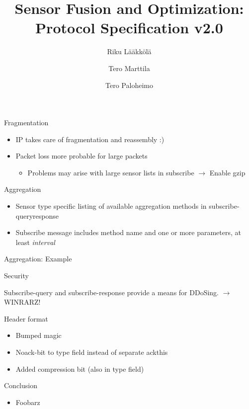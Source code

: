 \documentclass{beamer}
\title[SFO protocol]{Sensor Fusion and Optimization: Protocol Specification v2.0}
\author{Riku Lääkkölä \and Tero Marttila \and Tero Paloheimo}
\institute{Aalto ELEC}
\begin{document}
\begin{frame}
\titlepage
\end{frame}

\begin{frame}{Fragmentation}
\begin{itemize}
\item IP takes care of fragmentation and reassembly :)
\item Packet loss more probable for large packets
\begin{itemize}
\item Problems may arise with large sensor lists in subscribe $\rightarrow$ Enable gzip
\end{itemize}
\end{itemize}
\end{frame}

\begin{frame}{Aggregation}
\begin{itemize}
\item Sensor type specific listing of available aggregation methods in subscribe-queryresponse
\item Subscribe message includes method name and one or more parameters, at least \emph{interval}
\end{itemize}
\end{frame}

\begin{frame}{Aggregation: Example}
\end{frame}

\begin{frame}{Security}
\item Subscribe-query and subscribe-response provide a means for DDoSing. $\rightarrow$ WINRARZ!
\end{frame}

\begin{frame}{Header format}
\begin{itemize}
\item Bumped magic
\item Noack-bit to type field instead of separate ackthis
\item Added compression bit (also in type field)
\end{itemize}
\end{frame}


\begin{frame}{Conclusion}
\begin{itemize}
\item Foobarz
\end{itemize}
\end{frame}
\end{document}
